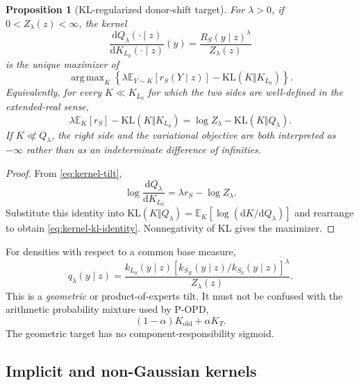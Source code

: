 \documentclass[11pt,a4paper]{article}
\newcommand{\E}{\mathbb{E}}
\newcommand{\KL}{\mathrm{KL}}
\newcommand{\dd}{\mathrm{d}}
\newcommand{\Sbase}{S_0}
\newcommand{\Srl}{S_R}
\newcommand{\Lbase}{L_0}
\DeclareMathOperator*{\argmaxop}{arg\,max}
\theoremstyle{plain}
\newtheorem{proposition}[theorem]{Proposition}
\theoremstyle{definition}
\begin{document}
\begin{proposition}[KL-regularized donor-shift target]
\label{prop:kernel-tilt}
For $\lambda>0$, if $0<Z_\lambda(z)<\infty$, the kernel
\begin{equation}
\frac{
  \dd Q_\lambda(\cdot\mid z)
}{
  \dd K_{\Lbase}(\cdot\mid z)
}(y)
=
\frac{R_S(y\mid z)^\lambda}{Z_\lambda(z)}
\label{eq:kernel-tilt}
\end{equation}
is the unique maximizer of
\begin{equation}
\argmaxop_K
\left\{
\lambda\E_{Y\sim K}[r_S(Y\mid z)]
-
\KL(K\Vert K_{\Lbase})
\right\}.
\label{eq:kernel-variational}
\end{equation}
Equivalently, for every $K\ll K_{\Lbase}$ for which the two sides are
well-defined in the extended-real sense,
\begin{equation}
\lambda\E_K[r_S]
-\KL(K\Vert K_{\Lbase})
=
\log Z_\lambda
-\KL(K\Vert Q_\lambda).
\label{eq:kernel-kl-identity}
\end{equation}
If $K\not\ll Q_\lambda$, the right side and the variational objective are both interpreted as
$-\infty$ rather than as an indeterminate difference of infinities.
\end{proposition}

\begin{proof}
From \eqref{eq:kernel-tilt},
\[
\log\frac{\dd Q_\lambda}{\dd K_{\Lbase}}
=
\lambda r_S-\log Z_\lambda .
\]
Substitute this identity into
$\KL(K\Vert Q_\lambda)
=\E_K[\log(\dd K/\dd Q_\lambda)]$
and rearrange to obtain \eqref{eq:kernel-kl-identity}.  Nonnegativity of KL gives the maximizer.
\end{proof}

For densities with respect to a common base measure,
\begin{equation}
q_\lambda(y\mid z)
=
\frac{
  k_{\Lbase}(y\mid z)
  \left[
    k_{\Srl}(y\mid z)/k_{\Sbase}(y\mid z)
  \right]^\lambda
}{
  Z_\lambda(z)
}.
\label{eq:density-tilt}
\end{equation}
This is a \emph{geometric} or product-of-experts tilt.  It must not be confused with the
arithmetic probability mixture used by P-OPD,
\begin{equation}
(1-\alpha)K_{\mathrm{old}}+\alpha K_T.
\label{eq:not-mixture}
\end{equation}
The geometric target has no component-responsibility sigmoid.

\subsection{Implicit and non-Gaussian kernels}
\end{document}
